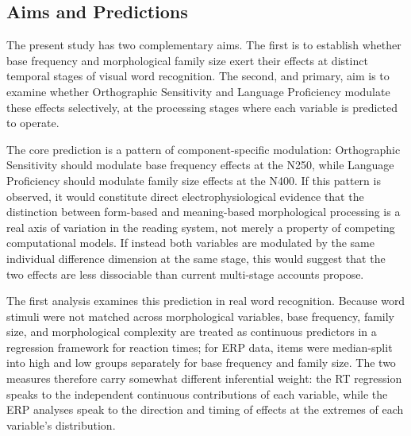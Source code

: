\documentclass[utf8]{FrontiersinHarvard} %
\begin{document}
	\subsection{Aims and Predictions}

	The present study has two complementary aims. The first is to establish whether base frequency and morphological family size exert their effects at distinct temporal stages of visual word recognition. The second, and primary, aim is to examine whether Orthographic Sensitivity and Language Proficiency modulate these effects selectively, at the processing stages where each variable is predicted to operate.

	The core prediction is a pattern of component-specific modulation: Orthographic Sensitivity should modulate base frequency effects at the N250, while Language Proficiency should modulate family size effects at the N400. If this pattern is observed, it would constitute direct electrophysiological evidence that the distinction between form-based and meaning-based morphological processing is a real axis of variation in the reading system, not merely a property of competing computational models. If instead both variables are modulated by the same individual difference dimension at the same stage, this would suggest that the two effects are less dissociable than current multi-stage accounts propose.

	The first analysis examines this prediction in real word recognition. Because word stimuli were not matched across morphological variables, base frequency, family size, and morphological complexity are treated as continuous predictors in a regression framework for reaction times; for ERP data, items were median-split into high and low groups separately for base frequency and family size. The two measures therefore carry somewhat different inferential weight: the RT regression speaks to the independent continuous contributions of each variable, while the ERP analyses speak to the direction and timing of effects at the extremes of each variable's distribution.
\end{document}
